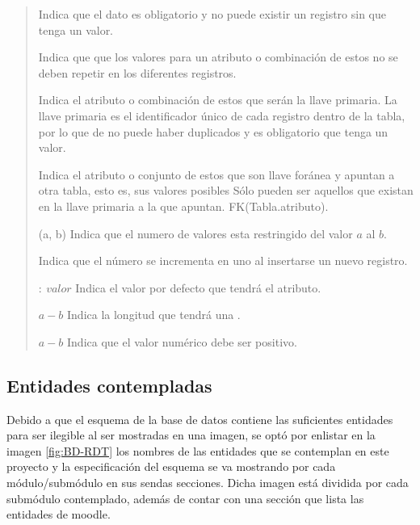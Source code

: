     \begin{quote}
    \begin{bGlosario}

            Indica que el dato es obligatorio y no puede existir un registro sin que tenga
            un valor.

            Indica que que los valores para un atributo o combinación de estos no se deben
            repetir en los diferentes registros.

            Indica el atributo o combinación de estos que serán la llave primaria. La llave
            primaria es el identificador único de cada registro dentro de la tabla, por lo
            que de no puede haber duplicados y es obligatorio que tenga un valor.

            Indica el atributo o conjunto de estos que son llave foránea y apuntan a otra
            tabla, esto es, sus valores posibles Sólo pueden ser aquellos que existan en la
            llave primaria a la que apuntan. FK(Tabla.atributo).

        (a, b)
            Indica que el numero de valores esta restringido del valor $a$ al $b$.

            Indica que el número se incrementa en uno al insertarse un nuevo registro.

         $:\ valor$
            Indica el valor por defecto que tendrá el atributo.

         $a-b$
            Indica la longitud que tendrá una .

         $a-b$
            Indica que el valor numérico debe ser positivo.
    \end{bGlosario}
    \end{quote}

\clearpage

\subsection{Entidades contempladas}

 Debido a que el esquema de la base de datos contiene las suficientes entidades para ser ilegible al ser mostradas en una imagen, se optó por
 enlistar en la imagen \ref{fig:BD-RDT} los nombres de las entidades que se contemplan en este proyecto y la especificación del esquema se va mostrando
 por cada módulo/submódulo en sus sendas secciones. Dicha imagen está dividida
 por cada submódulo contemplado, además de contar con una sección que lista las entidades de moodle.\\


